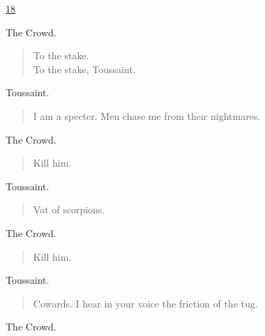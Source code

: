 \documentclass[letterpaper,article,12pt,oneside,notitlepage]{memoir}
\begin{document}
\clearpage

\href{http://cesaire.elotroalex.com/chiens/chiens/p018.html}{18}

\begin{center}The Crowd.\end{center}

\begin{verse}
To the stake. \\
To the stake, Toussaint. \\
\end{verse}

\begin{center}Toussaint.\end{center}

\begin{verse}
\hspace{1cm} I am a specter. Men chase me from their nightmares. \\
\end{verse}

\begin{center}The Crowd.\end{center}

\begin{verse}
Kill him. \\
\end{verse}

\begin{center}Toussaint.\end{center}

\begin{verse}
Vat of scorpions. \\
\end{verse}

\begin{center}The Crowd.\end{center}

\begin{verse}
Kill him. \\
\end{verse}

\begin{center}Toussaint.\end{center}

\begin{verse}
Cowards. I hear in your voice the friction of the tug. \\
\end{verse}

\begin{center}The Crowd.\end{center}
\end{document}
